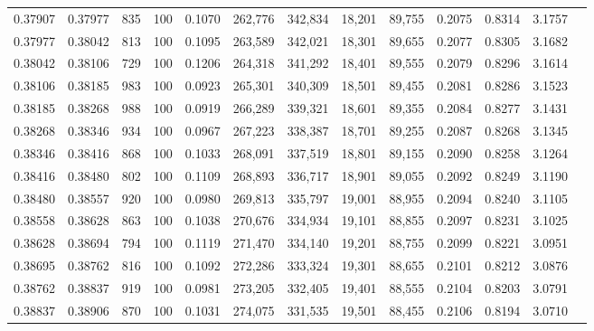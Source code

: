 \begin{tabular}{rrrrrrrrrrrrr}
0.37907 & 0.37977 &   835 & 100 &                                     0.1070 & 262,776 & 342,834 &  18,201 &  89,755 & 0.2075 & 0.8314 & 3.1757 \\
0.37977 & 0.38042 &   813 & 100 &                                     0.1095 & 263,589 & 342,021 &  18,301 &  89,655 & 0.2077 & 0.8305 & 3.1682 \\
0.38042 & 0.38106 &   729 & 100 &                                     0.1206 & 264,318 & 341,292 &  18,401 &  89,555 & 0.2079 & 0.8296 & 3.1614 \\
0.38106 & 0.38185 &   983 & 100 &                                     0.0923 & 265,301 & 340,309 &  18,501 &  89,455 & 0.2081 & 0.8286 & 3.1523 \\
0.38185 & 0.38268 &   988 & 100 &                                     0.0919 & 266,289 & 339,321 &  18,601 &  89,355 & 0.2084 & 0.8277 & 3.1431 \\
0.38268 & 0.38346 &   934 & 100 &                                     0.0967 & 267,223 & 338,387 &  18,701 &  89,255 & 0.2087 & 0.8268 & 3.1345 \\
0.38346 & 0.38416 &   868 & 100 &                                     0.1033 & 268,091 & 337,519 &  18,801 &  89,155 & 0.2090 & 0.8258 & 3.1264 \\
0.38416 & 0.38480 &   802 & 100 &                                     0.1109 & 268,893 & 336,717 &  18,901 &  89,055 & 0.2092 & 0.8249 & 3.1190 \\
0.38480 & 0.38557 &   920 & 100 &                                     0.0980 & 269,813 & 335,797 &  19,001 &  88,955 & 0.2094 & 0.8240 & 3.1105 \\
0.38558 & 0.38628 &   863 & 100 &                                     0.1038 & 270,676 & 334,934 &  19,101 &  88,855 & 0.2097 & 0.8231 & 3.1025 \\
0.38628 & 0.38694 &   794 & 100 &                                     0.1119 & 271,470 & 334,140 &  19,201 &  88,755 & 0.2099 & 0.8221 & 3.0951 \\
0.38695 & 0.38762 &   816 & 100 &                                     0.1092 & 272,286 & 333,324 &  19,301 &  88,655 & 0.2101 & 0.8212 & 3.0876 \\
0.38762 & 0.38837 &   919 & 100 &                                     0.0981 & 273,205 & 332,405 &  19,401 &  88,555 & 0.2104 & 0.8203 & 3.0791 \\
0.38837 & 0.38906 &   870 & 100 &                                     0.1031 & 274,075 & 331,535 &  19,501 &  88,455 & 0.2106 & 0.8194 & 3.0710 \\

\end{tabular}
